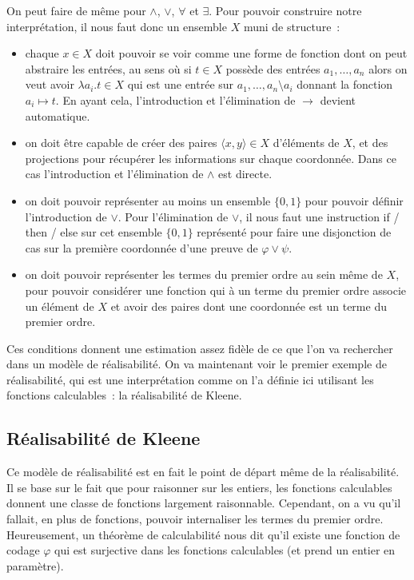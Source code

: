 \documentclass{article}
\begin{document}
On peut faire de même pour $\land$, $\lor$, $\forall$ et $\exists$. Pour pouvoir construire notre interprétation, il nous faut donc un ensemble $X$ muni de structure~:
\begin{itemize}
\item chaque $x\in X$ doit pouvoir se voir comme une forme de fonction dont on peut abstraire les entrées, au sens où si $t\in X$ possède des entrées $a_1,\ldots,a_n$ alors on veut avoir $\lambda a_i. t\in X$ qui est une entrée sur $a_1,\ldots,a_n \setminus a_i$ donnant la fonction $a_i \mapsto t$. En ayant cela, l'introduction et l'élimination de $\to$ devient automatique.
\item on doit être capable de créer des paires $\langle x,y\rangle \in X$ d'éléments de $X$, et des projections pour récupérer les informations sur chaque coordonnée. Dans ce cas l'introduction et l'élimination de $\land$ est directe.
\item on doit pouvoir représenter au moins un ensemble $\{0,1\}$ pour pouvoir définir l'introduction de $\lor$. Pour l'élimination de $\lor$, il nous faut une instruction if / then / else sur cet ensemble $\{0,1\}$ représenté pour faire une disjonction de cas sur la première coordonnée d'une preuve de $\varphi\lor \psi$.
\item on doit pouvoir représenter les termes du premier ordre au sein même de $X$, pour pouvoir considérer une fonction qui à un terme du premier ordre associe un élément de $X$ et avoir des paires dont une coordonnée est un terme du premier ordre.
\end{itemize}

Ces conditions donnent une estimation assez fidèle de ce que l'on va rechercher dans un modèle de réalisabilité. On va maintenant voir le premier exemple de réalisabilité, qui est une interprétation comme on l'a définie ici utilisant les fonctions calculables~: la réalisabilité de Kleene.

\subsection{Réalisabilité de Kleene}

Ce modèle de réalisabilité est en fait le point de départ même de la réalisabilité. Il se base sur le fait que pour raisonner sur les entiers, les fonctions calculables donnent une classe de fonctions largement raisonnable. Cependant, on a vu qu'il fallait, en plus de fonctions, pouvoir internaliser les termes du premier ordre. Heureusement, un théorème de calculabilité nous dit qu'il existe une fonction de codage $\varphi$ qui est surjective dans les fonctions calculables (et prend un entier en paramètre).
\end{document}
